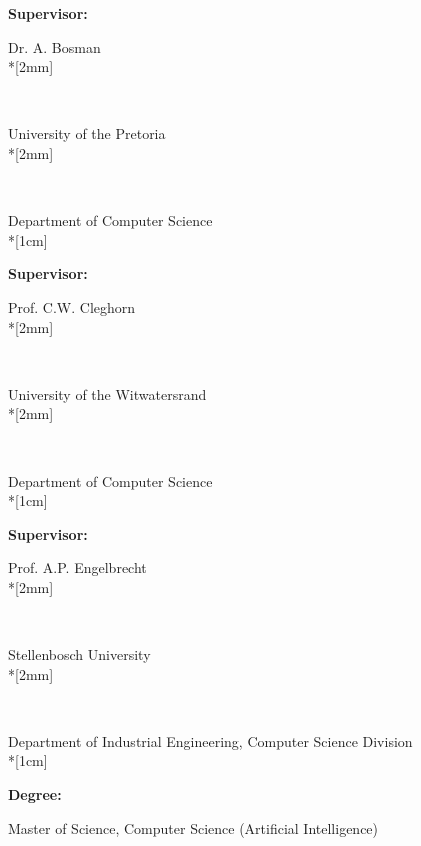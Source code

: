 \pagestyle{empty}
\vspace*{\fill}
\noindent
\parbox{4cm}{\textbf{Supervisor:}} Dr. A. Bosman \\*[2mm]
\parbox{4cm}{\textbf{~}} University of the Pretoria \\*[2mm]
\parbox{4cm}{\textbf{~}} Department of Computer Science\\*[1cm]
\parbox{4cm}{\textbf{Supervisor:}} Prof. C.W. Cleghorn \\*[2mm]
\parbox{4cm}{\textbf{~}} University of the Witwatersrand\\*[2mm]
\parbox{4cm}{\textbf{~}} Department of Computer Science\\*[1cm]
\parbox{4cm}{\textbf{Supervisor:}} Prof. A.P. Engelbrecht \\*[2mm]
\parbox{4cm}{\textbf{~}} Stellenbosch University\\*[2mm]
\parbox{4cm}{\textbf{~}} Department of Industrial Engineering, Computer Science Division\\*[1cm]
\parbox{4cm}{\textbf{Degree:}} Master of Science, Computer Science (Artificial Intelligence)
\newpage
